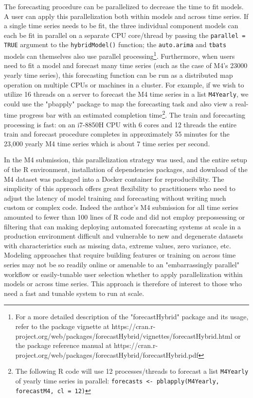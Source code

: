 \documentclass[11pt,3p,review,authoryear]{elsarticle}
\begin{document}
The forecasting procedure can be parallelized to decrease the time to fit models. A user can apply this parallelization both within models and across time series. If a single time series needs to be fit, the three individual component models can each be fit in parallel on a separate CPU core/thread by passing the \texttt{parallel = TRUE} argument to the \texttt{hybridModel()} function; the \texttt{auto.arima} and \texttt{tbats} models can themselves also use parallel processing\footnote{For a more detailed description of the "forecastHybrid" package and its usage, refer to the package vignette at https://cran.r-project.org/web/packages/forecastHybrid/vignettes/forecastHybrid.html or the package reference manual at https://cran.r-project.org/web/packages/forecastHybrid/forecastHybrid.pdf}. Furthermore, when users need to fit a model and forecast many time series (such as the case of M4's 23000 yearly time series), this forecasting function can be run as a distributed map operation on multiple CPUs or machines in a cluster. For example, if we wish to utilize 16 threads on a server to forecast the M4 time series in a list \texttt{M4Yearly}, we could use the "pbapply" package \citep{pbapply} to map the forecasting task and also view a real-time progress bar with an estimated completion time\footnote{The following R code will use 12 processes/threads to forecast a list \texttt{M4Yearly} of yearly time series in parallel: \texttt{forecasts <- pblapply(M4Yearly, forecastM4, cl = 12)}}. The train and forecasting processing is fast: on an i7-8850H CPU with 6 cores and 12 threads the entire train and forecast procedure completes in approximately 55 minutes for the 23,000 yearly M4 time series which is about 7 time series per second.


In the M4 submission, this parallelization strategy was used, and the entire setup of the R environment, installation of dependencies packages, and download of the M4 dataset was packaged into a Docker container for reproducibility. The simplicity of this approach offers great flexibility to practitioners who need to adjust the latency of model training and forecasting without writing much custom or complex code. Indeed the author's M4 submission for all time series amounted to fewer than 100 lines of R code and did not employ prepossessing or filtering that can making deploying automated forecasting systems at scale in a production environment difficult and vulnerable to new and degenerate datasets with characteristics such as missing data, extreme values, zero variance, etc. Modeling approaches that require building features or training on across time series may not be so readily online or amenable to an "embarrassingly parallel" workflow or easily-tunable user selection whether to apply parallelization within models or across time series. This approach is therefore of interest to those who need a fast and tunable system to run at scale.
\end{document}
